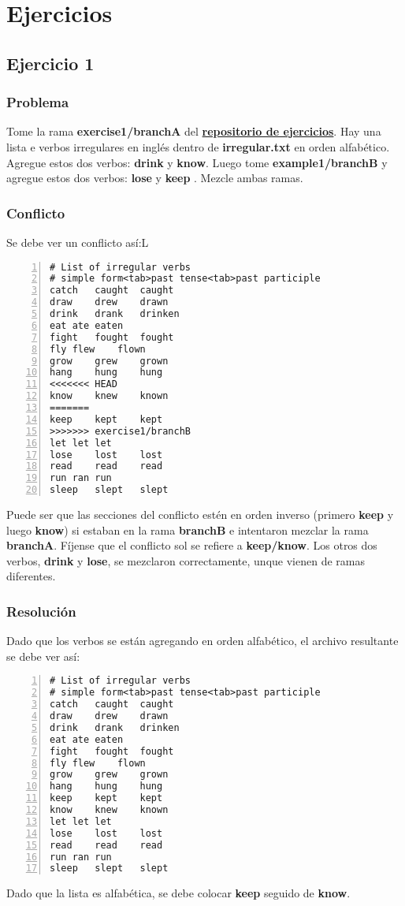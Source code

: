 
\chapter{Ejercicios}

\section{Ejercicio 1}
\label{exercise_01}
\subsection*{Problema}
Tome la rama {\bf exercise1/branchA } del \hyperref[exercises_repo]{\bf repositorio de ejercicios}. Hay una lista
e verbos irregulares en inglés dentro de {\bf irregular.txt} en orden alfabético. Agregue estos dos verbos: {\bf drink} y {\bf know}.
Luego tome {\bf example1/branchB } y agregue estos dos verbos: {\bf lose } y {\bf keep }. Mezcle ambas ramas.

\subsection*{Conflicto}
Se debe ver un conflicto así:L
\begin{lstlisting}[style=console_style, numbers=left, caption={\bf Ejercicio 1} - conflicto]
# List of irregular verbs
# simple form<tab>past tense<tab>past participle
catch	caught	caught
draw	drew	drawn
drink	drank	drinken
eat	ate	eaten
fight	fought	fought
fly	flew	flown
grow	grew	grown
hang	hung	hung
<<<<<<< HEAD
know	knew	known
=======
keep	kept	kept
>>>>>>> exercise1/branchB
let	let	let
lose	lost	lost
read	read	read
run	ran	run
sleep	slept	slept
\end{lstlisting}

Puede ser que las secciones del conflicto estén en orden inverso (primero {\bf keep} y luego {\bf know}) si estaban en la rama
{\bf branchB} e intentaron mezclar la rama {\bf branchA}. Fíjense que el conflicto sol se refiere a {\bf keep/know}. Los otros dos verbos,
{\bf drink} y {\bf lose}, se mezclaron correctamente, unque vienen de ramas diferentes.

\subsection*{Resolución}
Dado que los verbos se están agregando en orden alfabético, el archivo resultante se debe ver así:
\begin{lstlisting}[style=console_style, numbers=left, caption={\bf Ejercicio 1} - Resolución]
# List of irregular verbs
# simple form<tab>past tense<tab>past participle
catch	caught	caught
draw	drew	drawn
drink	drank	drinken
eat	ate	eaten
fight	fought	fought
fly	flew	flown
grow	grew	grown
hang	hung	hung
keep	kept	kept
know	knew	known
let	let	let
lose	lost	lost
read	read	read
run	ran	run
sleep	slept	slept
\end{lstlisting}
Dado que la lista es alfabética, se debe colocar {\bf keep} seguido de {\bf know}.


